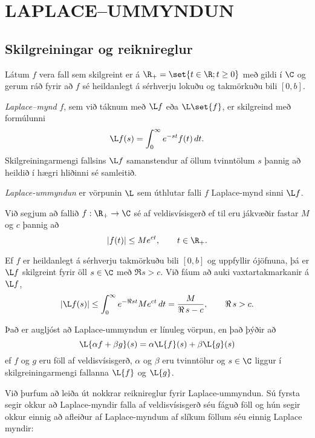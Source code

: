 %

\chapter {LAPLACE--UMMYNDUN}
 

\section{ Skilgreiningar og reiknireglur}  

\noindent
Látum $f$ vera fall sem skilgreint er á 
$\R_+=\set{t\in \R; t\geq 0}$ með gildi í $\C$ og gerum ráð fyrir að
$f$ sé heildanlegt á sérhverju lokuðu og takmörkuðu bili $[0,b]$.


{\it Laplace--mynd} $f$, 
sem við táknum með $\L f$ eða $\L\set{f}$, er skilgreind með
formúlunni
 \begin{equation*}\L f(s)=\int_0\sp \infty e\sp{-st}f(t)\, dt.\label{7.1.1}
 \end{equation*}
Skilgreiningarmengi fallsins $\L f$ samanstendur af öllum
tvinntölum $s$ þannig að heildið í hægri hliðinni sé samleitið.  


{\it Laplace-ummyndun} er vörpunin $\L$ sem úthlutar falli $f$ 
Laplace-mynd sinni $\L f$.


\begin{sk}\label{skil10.1.1a}
Við segjum að fallið $f:\R_+\to \C$ sé af
veldisvísisgerð ef til eru
jákvæðir fastar $M$ og $c$ þannig að 
 \begin{equation*}|f(t)|\leq Me\sp{c t}, \qquad t\in \R_+.\label{7.1.2}
 \end{equation*}
\end{sk}

Ef $f$ er heildanlegt á sérhverju takmörkuðu bili $[0,b]$ og uppfyllir 
ójöfnuna, þá er $\L f$ skilgreint fyrir öll $s\in \C$ með $\Re s
>c$.   Við fáum að auki
vaxtartakmarkanir á $\L f$,
 \begin{equation*}
|\L f(s) |\leq \int_0\sp\infty e\sp{-\Re st} Me\sp{c t} \, dt =
\dfrac M{\Re\,  s-c}, \qquad \Re\,  s>c.
\label{7.1.3}
 \end{equation*}


Það er augljóst að Laplace-ummyndun er línuleg vörpun, en það þýðir að
$$
\L\{\alpha f+\beta g\}(s)=\alpha\L\{f\}(s)+\beta\L\{g\}(s)
$$
ef $f$ og $g$ eru föll af veldisvísisgerð, $\alpha$ og $\beta$ eru
tvinntölur og $s\in \C$ liggur í skilgreiningarmengi fallanna
$\L\{f\}$ og $\L\{g\}$.

\smallskip
Við þurfum að leiða út nokkrar reiknireglur fyrir Laplace-ummyndun.
Sú fyrsta segir okkur að Laplace-myndir falla af veldisvísisgerð séu
fáguð föll og hún segir okkur einnig að afleiður af Laplace-myndum 
af slíkum föllum  séu  einnig Laplace myndir: 



